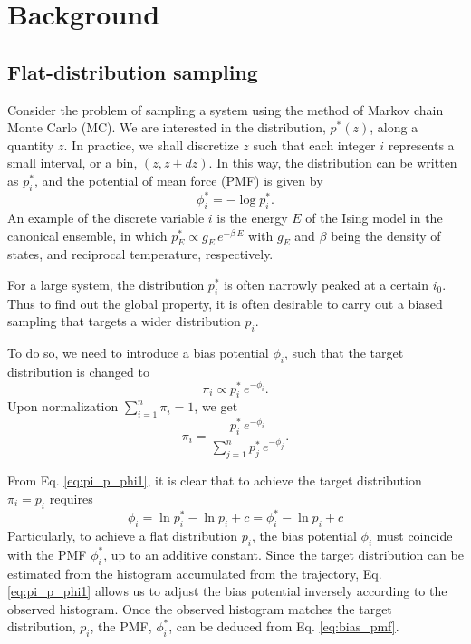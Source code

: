 \documentclass[reprint]{revtex4-1}
\begin{document}
\section{Background}



\subsection{Flat-distribution sampling}



Consider the problem of sampling a system
using the method of Markov chain Monte Carlo (MC).
%
We are interested in the distribution, $p^*(z)$,
along a quantity $z$.
%
In practice, we shall discretize $z$
such that each integer $i$ represents
a small interval, or a bin, $(z, z + dz)$.
%
In this way,
the distribution can be written as $p^*_i$,
and the potential of mean force (PMF)
is given by
%
\begin{equation}
\phi^*_i = -\log p^*_i.
\label{eq:pmf_def}
\end{equation}
%
An example of the discrete variable $i$
is the energy $E$ of the Ising model
in the canonical ensemble,
in which $p^*_E \propto g_E \, e^{-\beta \, E}$
with $g_E$ and $\beta$ being the density of states,
and reciprocal temperature, respectively.



For a large system,
the distribution $p^*_i$ is often
narrowly peaked at a certain $i_0$.
%
Thus to find out the global property,
it is often desirable to carry out
a biased sampling that targets
a wider distribution $p_i$.
%



To do so, we need to introduce a bias potential $\phi_i$,
such that the target distribution is changed to
%
\begin{equation}
  \pi_i \propto p^*_i \, e^{-\phi_i}.
  \label{eq:pi_p_phi1}
\end{equation}
%
Upon normalization $\sum_{i = 1}^n \pi_i = 1$,
we get
%
\begin{equation}
  \pi_i =
  \frac{ p^*_i \, e^{-\phi_i} }
  { \sum_{j = 1}^n p^*_j \, e^{-\phi_j} }.
  \label{eq:pi_p_phi}
\end{equation}



From Eq. \eqref{eq:pi_p_phi1},
it is clear that to achieve the target distribution
$\pi_i = p_i$ requires
%
\begin{equation}
\phi_i = \ln p^*_i - \ln p_i + c
=\phi^*_i - \ln p_i + c
\label{eq:bias_pmf}
\end{equation}
Particularly,
to achieve a flat distribution $p_i$,
the bias potential $\phi_i$
must coincide with the PMF $\phi^*_i$,
up to an additive constant.
%
Since the target distribution
can be estimated from the histogram
accumulated from the trajectory,
Eq. \eqref{eq:pi_p_phi1}
allows us to adjust the bias potential
inversely according to the observed histogram.
%
Once the observed histogram matches
the target distribution, $p_i$,
the PMF, $\phi^*_i$,
can be deduced from Eq. \eqref{eq:bias_pmf}.
\end{document}
